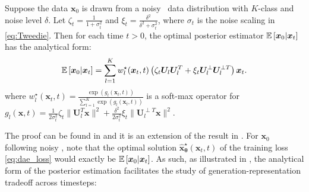 \begin{proposition}\label{lem:E[x_0]_multi}
Suppose the data $\bm x_0$ is drawn from a noisy \MoLRG~data distribution with $K$-class and noise level $\delta$. Let  $\zeta_t = \frac{1}{1 + \sigma_t^2}$ and $\xi_t = \frac{\delta^2}{\delta^2 + \sigma_t^2}$, where $\sigma_t$ is the noise scaling in \eqref{eq:Tweedie}. Then for each time $t > 0$, the optimal posterior estimator $\operatorname{\mathbb{E}}\left[\bm x_0 \vert \bm x_t\right]$ has the analytical form: 
\begin{align*}
    \operatorname{\mathbb{E}}\left[ \bm x_0 \vert \bm x_t\right] = \sum_{l=1}^K w^{\star}_l(\bm x_t,t) \left( \zeta_t \bm U_l\bm U_l^T + \xi_t \bm U_l^{\perp}\bm U_l^{\perp T} \right) \bm x_t.
\end{align*}
where $w^{\star}_l(\bm x_t,t) = \frac{\exp\left(g_l(\bm x_t, t) \right)}{\sum_{l=1}^K \exp\left(g_l(\bm x_t, t) \right)}$ is a soft-max operator for $g_l(\bm x,t) = \frac{1}{2\sigma_t^2}\zeta_t \|\bm U_l^T \bm x\|^2 + \frac{\delta^2}{2 \sigma_t^2}\xi_t \| \bm U_l^{\perp T} \bm x \|^2 $.
\end{proposition}
The proof can be found in  and it is an extension of the result in \citep{wang2024diffusion}. For $\bm x_0$ following noisy \MoLRG, note that the optimal solution $\hat{\bm x}_{\bm \theta}^{\star}(\bm x_t, t) $ of the training loss \eqref{eq:dae_loss} would exactly be $ \operatorname{\mathbb{E}}\left[\bm x_0 \vert \bm x_t\right]$. As such, as illustrated in , the analytical form of the posterior estimation facilitates the study of generation-representation tradeoff across timesteps:
